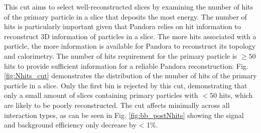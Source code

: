 This cut aims to select well-reconstructed slices by examining the number of hits of the primary particle in a slice that deposits the most energy.
The number of hits is particularly important given that Pandora relies on hit information to reconstruct 3D information of particles in a slice.                                                                  
The more hits associated with a particle, the more information is available for Pandora to reconstruct its topology and calorimetry.
The number of hits requirement for the primary particle is $\geq 50$ hits to provide sufficient information for a reliable Pandora reconstruction.
Fig. \ref{fig:Nhits_cut} demonstrates the distribution of the number of hits of the primary particle in a slice. 
Only the first bin is rejected by this cut, demonstrating that only a small amount of slices containing primary particles with $< 50$ hits, which are likely to be poorly reconstructed.
The cut affects minimally across all interaction types, as can be seen in Fig. \ref{fig:bb_postNhits} showing the signal and background efficiency only decrease by < 1\%.



